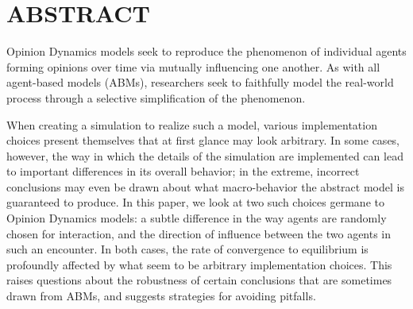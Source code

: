 
\section*{ABSTRACT}

Opinion Dynamics models seek to reproduce the phenomenon of individual agents
forming opinions over time via mutually influencing one another. As with all
agent-based models (ABMs), researchers seek to faithfully model the real-world
process through a selective simplification of the phenomenon.

When creating a simulation to realize such a model, various implementation
choices present themselves that at first glance may look arbitrary. In some
cases, however, the way in which the details of the simulation are implemented
can lead to important differences in its overall behavior; in the extreme,
incorrect conclusions may even be drawn about what macro-behavior the abstract
model is guaranteed to produce. In this paper, we look at two such choices
germane to Opinion Dynamics models: a subtle difference in the way agents are
randomly chosen for interaction, and the direction of influence between the
two agents in such an encounter. In both cases, the rate of convergence to
equilibrium is profoundly affected by what seem to be arbitrary implementation
choices. This raises questions about the robustness of certain conclusions
that are sometimes drawn from ABMs, and suggests strategies for avoiding
pitfalls.
